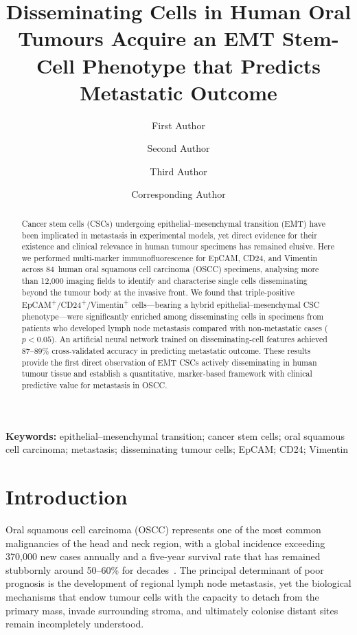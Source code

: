 \documentclass[11pt,a4paper]{article}
\title{\textbf{Disseminating Cells in Human Oral Tumours Acquire an EMT Stem-Cell Phenotype that Predicts Metastatic Outcome}}
\author[1]{First Author}
\author[1]{Second Author}
\author[2]{Third Author}
\author[1,2,*]{Corresponding Author}
\affil[1]{Department of Cell Biology, University Medical Centre, City, Country}
\affil[2]{Department of Oral and Maxillofacial Surgery, University Hospital, City, Country}
\affil[*]{Corresponding author: \texttt{corresponding@university.edu}}
\date{}
\begin{document}
\maketitle

\begin{abstract}
Cancer stem cells (CSCs) undergoing epithelial--mesenchymal transition (EMT) have been implicated in metastasis in experimental models, yet direct evidence for their existence and clinical relevance in human tumour specimens has remained elusive. Here we performed multi-marker immunofluorescence for EpCAM, CD24, and Vimentin across 84~human oral squamous cell carcinoma (OSCC) specimens, analysing more than 12{,}000 imaging fields to identify and characterise single cells disseminating beyond the tumour body at the invasive front. We found that triple-positive EpCAM\textsuperscript{+}/CD24\textsuperscript{+}/Vimentin\textsuperscript{+} cells---bearing a hybrid epithelial--mesenchymal CSC phenotype---were significantly enriched among disseminating cells in specimens from patients who developed lymph node metastasis compared with non-metastatic cases ($p < 0.05$). An artificial neural network trained on disseminating-cell features achieved 87--89\% cross-validated accuracy in predicting metastatic outcome. These results provide the first direct observation of EMT CSCs actively disseminating in human tumour tissue and establish a quantitative, marker-based framework with clinical predictive value for metastasis in OSCC.
\end{abstract}

\textbf{Keywords:} epithelial--mesenchymal transition; cancer stem cells; oral squamous cell carcinoma; metastasis; disseminating tumour cells; EpCAM; CD24; Vimentin

\section{Introduction}

Oral squamous cell carcinoma (OSCC) represents one of the most common malignancies of the head and neck region, with a global incidence exceeding 370{,}000 new cases annually and a five-year survival rate that has remained stubbornly around 50--60\% for decades~\cite{warnakulasuriya2009,tanaka2023}. The principal determinant of poor prognosis is the development of regional lymph node metastasis, yet the biological mechanisms that endow tumour cells with the capacity to detach from the primary mass, invade surrounding stroma, and ultimately colonise distant sites remain incompletely understood.
\end{document}
